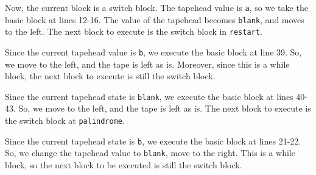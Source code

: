 \begin{appendices}
\begin{figure}[H]
\end{figure}
\noindent Now, the current block is a switch block. The tapehead value is \texttt{a}, so we take the basic block at lines 12-16. The value of the tapehead becomes \texttt{blank}, and moves to the left. The next block to execute is the switch block in \texttt{restart}.
\begin{figure}[H]
    \centering
\end{figure}
\noindent Since the current tapehead value is \texttt{b}, we execute the basic block at line 39. So, we move to the left, and the tape is left as is. Moreover, since this is a while block, the next block to execute is still the switch block.
\begin{figure}[H]
    \centering
\end{figure}
\noindent Since the current tapehead state is \texttt{blank}, we execute the basic block at lines 40-43. So, we move to the left, and the tape is left as is. The next block to execute is the switch block at \texttt{palindrome}.
\begin{figure}[H]
    \centering
\end{figure}
\noindent Since the current tapehead state is \texttt{b}, we execute the basic block at lines 21-22. So, we change the tapehead value to \texttt{blank}, move to the right. This is a while block, so the next block to be executed is still the switch block.
\begin{figure}[H]
    \centering
\end{figure}
\end{appendices}
